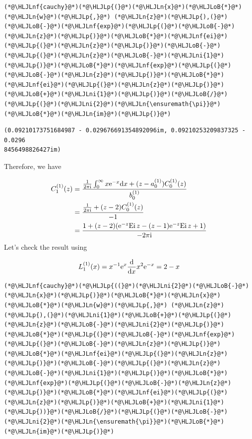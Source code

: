 \documentclass[12pt,a4paper]{article}
\newcommand{\HLJLn}[1]{#1}
\newcommand{\HLJLnf}[1]{\textcolor[RGB]{66,102,213}{#1}}
\newcommand{\HLJLni}[1]{\textcolor[RGB]{59,151,46}{#1}}
\newcommand{\HLJLoB}[1]{\textcolor[RGB]{102,102,102}{\textbf{#1}}}
\newcommand{\HLJLp}[1]{#1}
\def\D{ {\rm d} }
\def\I{ {\rm i} }
\def\E{ {\rm e} }
\def\Ei{ {\rm Ei}\, }
\def\dx{\D x}
\begin{document}
\begin{lstlisting}
(*@\HLJLnf{cauchy}@*)(*@\HLJLp{(}@*)(*@\HLJLn{x}@*)(*@\HLJLoB{*}@*)(*@\HLJLn{w}@*)(*@\HLJLp{,}@*) (*@\HLJLn{z}@*)(*@\HLJLp{),(}@*)(*@\HLJLoB{-}@*)(*@\HLJLnf{exp}@*)(*@\HLJLp{(}@*)(*@\HLJLoB{-}@*)(*@\HLJLn{z}@*)(*@\HLJLp{)}@*)(*@\HLJLoB{*}@*)(*@\HLJLnf{ei}@*)(*@\HLJLp{(}@*)(*@\HLJLn{z}@*)(*@\HLJLp{)}@*)(*@\HLJLoB{-}@*)(*@\HLJLp{(}@*)(*@\HLJLn{z}@*)(*@\HLJLoB{-}@*)(*@\HLJLni{1}@*)(*@\HLJLp{)}@*)(*@\HLJLoB{*}@*)(*@\HLJLnf{exp}@*)(*@\HLJLp{(}@*)(*@\HLJLoB{-}@*)(*@\HLJLn{z}@*)(*@\HLJLp{)}@*)(*@\HLJLoB{*}@*)(*@\HLJLnf{ei}@*)(*@\HLJLp{(}@*)(*@\HLJLn{z}@*)(*@\HLJLp{)}@*)(*@\HLJLoB{+}@*)(*@\HLJLni{1}@*)(*@\HLJLp{)}@*)(*@\HLJLoB{/}@*)(*@\HLJLp{(}@*)(*@\HLJLni{2}@*)(*@\HLJLn{\ensuremath{\pi}}@*)(*@\HLJLoB{*}@*)(*@\HLJLn{im}@*)(*@\HLJLp{)}@*)
\end{lstlisting}

\begin{lstlisting}
(0.09210173751684987 - 0.029676691354892096im, 0.09210253209837325 - 0.0296
8456498826427im)
\end{lstlisting}


Therefore, we have


\begin{align*}
C_1^{(1)}(z) &= {{1 \over 2 \pi \I} \int_0^\infty x \E^{-x} \dx + (z-a_0^{(1)}) C_0^{(1)}(z) \over b_0^{(1)}} \\
&=  {{1 \over 2 \pi \I}  + (z-2) C_0^{(1)}(z) \over -1}\\
&=  {1  + (z-2) (\E^{-z} \Ei z - (z-1) \E^{-z} \Ei z +1) \over -2 \pi \I}
\end{align*}
Let's check the result using

\[
L_1^{(1)}(x) = x^{-1} \E^x {\D \over \dx} x^2 \E^{-x} = 2 - x
\]

\begin{lstlisting}
(*@\HLJLnf{cauchy}@*)(*@\HLJLp{((}@*)(*@\HLJLni{2}@*)(*@\HLJLoB{-}@*)(*@\HLJLn{x}@*)(*@\HLJLp{)}@*)(*@\HLJLoB{*}@*)(*@\HLJLn{x}@*)(*@\HLJLoB{*}@*)(*@\HLJLn{w}@*)(*@\HLJLp{,}@*) (*@\HLJLn{z}@*)(*@\HLJLp{),(}@*)(*@\HLJLni{1}@*)(*@\HLJLoB{+}@*)(*@\HLJLp{(}@*)(*@\HLJLn{z}@*)(*@\HLJLoB{-}@*)(*@\HLJLni{2}@*)(*@\HLJLp{)}@*)(*@\HLJLoB{*}@*)(*@\HLJLp{(}@*)(*@\HLJLoB{-}@*)(*@\HLJLnf{exp}@*)(*@\HLJLp{(}@*)(*@\HLJLoB{-}@*)(*@\HLJLn{z}@*)(*@\HLJLp{)}@*)(*@\HLJLoB{*}@*)(*@\HLJLnf{ei}@*)(*@\HLJLp{(}@*)(*@\HLJLn{z}@*)(*@\HLJLp{)}@*)(*@\HLJLoB{-}@*)(*@\HLJLp{(}@*)(*@\HLJLn{z}@*)(*@\HLJLoB{-}@*)(*@\HLJLni{1}@*)(*@\HLJLp{)}@*)(*@\HLJLoB{*}@*)(*@\HLJLnf{exp}@*)(*@\HLJLp{(}@*)(*@\HLJLoB{-}@*)(*@\HLJLn{z}@*)(*@\HLJLp{)}@*)(*@\HLJLoB{*}@*)(*@\HLJLnf{ei}@*)(*@\HLJLp{(}@*)(*@\HLJLn{z}@*)(*@\HLJLp{)}@*)(*@\HLJLoB{+}@*)(*@\HLJLni{1}@*)(*@\HLJLp{))}@*)(*@\HLJLoB{/}@*)(*@\HLJLp{(}@*)(*@\HLJLoB{-}@*)(*@\HLJLni{2}@*)(*@\HLJLn{\ensuremath{\pi}}@*)(*@\HLJLoB{*}@*)(*@\HLJLn{im}@*)(*@\HLJLp{)}@*)
\end{lstlisting}
\end{document}
